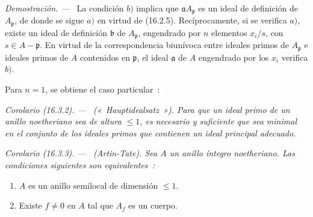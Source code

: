 \documentclass[10pt,oneside]{book}
\makeatletter
\newcommand{\setmanualcurrentlabel}[1]{\def\@currentlabel{#1}}
\newcommand{\oldpage}[2][]{%
  \setcounter{footnote}{0}%
  \marginpar{\scriptsize\textbf{#1}~|~#2}\ignorespaces}
\newenvironment{corollary}[1][]{%
  \setmanualcurrentlabel{#1}\par\medskip\noindent\itshape Corolario (#1). ---\ }{\par}
\newenvironment{proof}{%
  \par\medskip\noindent\textit{Demostración. ---\ }}{\par}
\providecommand{\setmin}{-}%
\makeatother
\begin{document}
\begin{proof}
La condición $b)$ implica que $\mathfrak{a}A_{\mathfrak{p}}$ es un ideal de
definición de $A_{\mathfrak{p}}$, de donde se sigue $a)$ en virtud de (16.2.5).
Recíprocamente, si se verifica $a)$, existe un ideal de definición
$\mathfrak{b}$ de $A_{\mathfrak{p}}$, engendrado por $n$ elementos $x_i/s$, con
$s\in A\setmin\mathfrak{p}$. En virtud de la correspondencia biunívoca entre ideales
primos de $A_{\mathfrak{p}}$ e ideales primos de $A$ contenidos en
$\mathfrak{p}$, el ideal $\mathfrak{a}$ de $A$ engendrado por los $x_i$ verifica
$b)$.
\end{proof}

\oldpage[0\textsubscript{IV-1}]{29}

Para $n=1$, se obtiene el caso particular~:

\begin{corollary}[16.3.2]
\label{0.16.3.2-es}
\textup{(«~Hauptidealsatz~»).}
Para que un ideal primo de un anillo noetheriano sea de altura $\leq1$, es
necesario y suficiente que sea minimal en el conjunto de los ideales primos que
contienen un ideal principal adecuado.
\end{corollary}

\begin{corollary}[16.3.3]
\label{0.16.3.3-es}
\textup{(Artin-Tate).}
Sea $A$ un anillo íntegro noetheriano. Las condiciones siguientes son
equivalentes~:
\begin{enumerate}
  \item[\textup{a)}] $A$ es un anillo semilocal de dimensión $\leq1$.
  \item[\textup{b)}] Existe $f\neq0$ en $A$ tal que $A_f$ es un cuerpo.
\end{enumerate}
\end{corollary}
\end{document}
